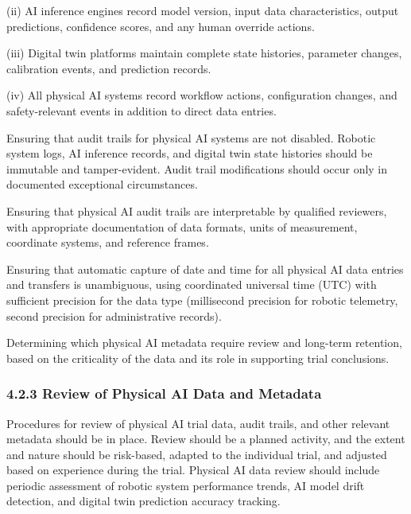 (ii) AI inference engines record model version, input data characteristics, output predictions, confidence scores, and any human override actions.

(iii) Digital twin platforms maintain complete state histories, parameter changes, calibration events, and prediction records.

(iv) All physical AI systems record workflow actions, configuration changes, and safety-relevant events in addition to direct data entries.

\begin{description}[leftmargin=2.5cm,style=sameline]

\item[(b)] Ensuring that audit trails for physical AI systems are not disabled. Robotic system logs, AI inference records, and digital twin state histories should be immutable and tamper-evident. Audit trail modifications should occur only in documented exceptional circumstances.

\item[(c)] Ensuring that physical AI audit trails are interpretable by qualified reviewers, with appropriate documentation of data formats, units of measurement, coordinate systems, and reference frames.

\item[(d)] Ensuring that automatic capture of date and time for all physical AI data entries and transfers is unambiguous, using coordinated universal time (UTC) with sufficient precision for the data type (millisecond precision for robotic telemetry, second precision for administrative records).

\item[(e)] Determining which physical AI metadata require review and long-term retention, based on the criticality of the data and its role in supporting trial conclusions.

\end{description}

\subsubsection{4.2.3 Review of Physical AI Data and Metadata}

Procedures for review of physical AI trial data, audit trails, and other relevant metadata should be in place. Review should be a planned activity, and the extent and nature should be risk-based, adapted to the individual trial, and adjusted based on experience during the trial. Physical AI data review should include periodic assessment of robotic system performance trends, AI model drift detection, and digital twin prediction accuracy tracking.

